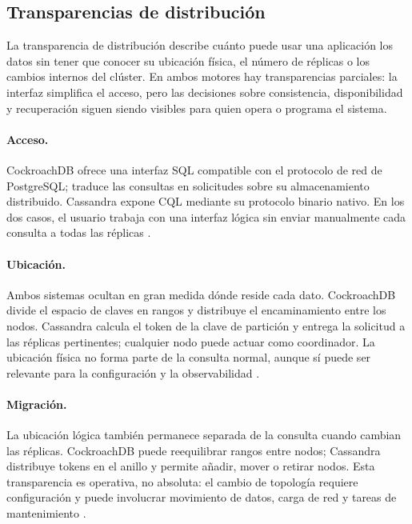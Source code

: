 \documentclass[11pt,a4paper]{article}
\begin{document}
\subsection{Transparencias de distribución}

La transparencia de distribución describe cuánto puede usar una aplicación los datos sin tener que conocer su ubicación física, el número de réplicas o los cambios internos del clúster. En ambos motores hay transparencias parciales: la interfaz simplifica el acceso, pero las decisiones sobre consistencia, disponibilidad y recuperación siguen siendo visibles para quien opera o programa el sistema.

\paragraph{Acceso.} CockroachDB ofrece una interfaz SQL compatible con el protocolo de red de PostgreSQL; traduce las consultas en solicitudes sobre su almacenamiento distribuido. Cassandra expone CQL mediante su protocolo binario nativo. En los dos casos, el usuario trabaja con una interfaz lógica sin enviar manualmente cada consulta a todas las réplicas \cite{cockroachlabsArchitecture,cockroachlabsDeveloperBasics,apacheCassandraNative}.

\paragraph{Ubicación.} Ambos sistemas ocultan en gran medida dónde reside cada dato. CockroachDB divide el espacio de claves en rangos y distribuye el encaminamiento entre los nodos. Cassandra calcula el token de la clave de partición y entrega la solicitud a las réplicas pertinentes; cualquier nodo puede actuar como coordinador. La ubicación física no forma parte de la consulta normal, aunque sí puede ser relevante para la configuración y la observabilidad \cite{cockroachlabsArchitecture,apacheCassandraDynamo}.

\paragraph{Migración.} La ubicación lógica también permanece separada de la consulta cuando cambian las réplicas. CockroachDB puede reequilibrar rangos entre nodos; Cassandra distribuye tokens en el anillo y permite añadir, mover o retirar nodos. Esta transparencia es operativa, no absoluta: el cambio de topología requiere configuración y puede involucrar movimiento de datos, carga de red y tareas de mantenimiento \cite{cockroachlabsReplication,apacheCassandraDynamo}.
\end{document}
